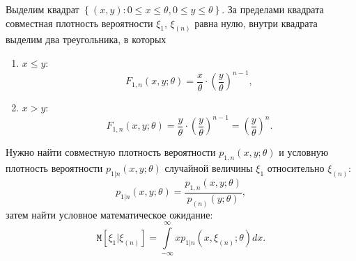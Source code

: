 \documentclass[a4paper,12pt]{article}
\newcommand{\cexpectation}[2]{\texttt{M} \left[ #1 | #2 \right]}
\begin{document}
\begin{enumerate}
\begin{enumerate}
                    Выделим квадрат $\left \{ (x,y): 0 \le x \le \theta, 0 \le y \le \theta \right \}$. За пределами квадрата совместная
                    плотность вероятности $\xi_1$, $\xi_{(n)}$ равна нулю, внутри квадрата выделим два треугольника, в которых
                    \begin{enumerate}
                        \item $x \le y$:
                              \[
                                  F_{1,n}(x,y; \theta)
                                  = \frac{x}{\theta} \cdot \left( \frac{y}{\theta} \right)^{n-1},
                              \]
                        \item $x > y$:
                              \[
                                  F_{1,n}(x,y; \theta)
                                  = \frac{y}{\theta} \cdot \left( \frac{y}{\theta} \right)^{n-1}
                                  = \left( \frac{y}{\theta} \right)^n .
                              \]
                    \end{enumerate}
                    Нужно найти совместную плотность вероятности $p_{1,n}(x,y; \theta)$ и условную плотность вероятности $p_{1|n}(x, y; \theta)$
                    случайной величины $\xi_1$ относительно $\xi_{(n)}$:
                    \[
                        p_{1|n}(x, y; \theta)
                        = \frac{p_{1,n}(x,y; \theta)}{p_{(n)}(y; \theta)} ,
                    \]
                    затем найти условное математическое ожидание:
                    \[
                        \cexpectation{\xi_1}{\xi_{(n)}}
                        = \int \limits_{-\infty}^{\infty} x p_{1|n}(x, \xi_{(n)}; \theta) dx .
                    \]
          \end{enumerate}
\end{enumerate}
\end{document}

